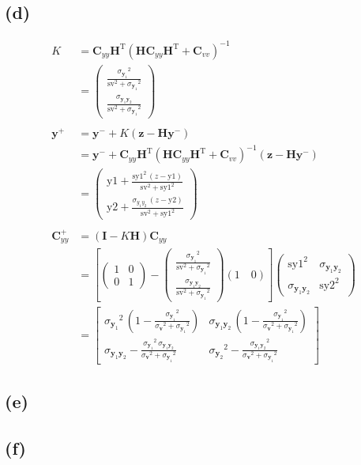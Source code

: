 \documentclass[fleqn, letterpaper]{tufte-handout}
\newcommand{\T}{^\text{T}}
\newcommand{\y}{\mathbf{y}}
\newcommand{\z}{\mathbf{z}}
\newcommand{\I}{\mathbf{I}}
\newcommand{\HH}{\mathbf{H}}
\newcommand{\vecv}{\mathbf{v}}
\newcommand{\cyy}{\mathbf{C}_{yy}}
\newcommand{\cvv}{\mathbf{C}_{vv}}
\newcommand{\KK}{\left(\begin{array}{c} \frac{{\sigma_{\y_1}}^2}{{\mathrm{sv}}^2 + {\sigma_{\y_1}}^2}\\ \frac{\sigma_{\y_1\y_2}}{{\mathrm{sv}}^2 + {\sigma_{\y_1}}^2} \end{array}\right)}
\newcommand{\cyylong}{\left(\begin{array}{cc} {\mathrm{sy1}}^2 & \sigma_{\y_1\y_2}\\ \sigma_{\y_1\y_2} & {\mathrm{sy2}}^2 \end{array}\right)}
\begin{document}
\subsection{(d)}
\begin{align*}
K &= \cyy \HH\T(\HH\cyy\HH\T+\cvv)^{-1} \\
&= \KK\\ \\
\y^+ &= \y^- + K(\z-\HH\y^-) \\
&= \y^- + \cyy \HH\T(\HH\cyy\HH\T+\cvv)^{-1}(\z-\HH\y^-) \\ 
&= \left(\begin{array}{c} \mathrm{y1} + \frac{{\mathrm{sy1}}^2\, \left(z - \mathrm{y1}\right)}{{\mathrm{sv}}^2 + {\mathrm{sy1}}^2}\\ \mathrm{y2} + \frac{\sigma_{y_1y_2}\, \left(z - \mathrm{y2}\right)}{{\mathrm{sv}}^2 + {\mathrm{sy1}}^2} \end{array}\right)\\ \\
\cyy^+  &= \left(\I - K\HH\right)\cyy\\
&= \left[\left(\begin{array}{cc} 1 & 0\\ 0 & 1 \end{array}\right) - \KK (1\quad 0)\right]\cyylong\\
&= \left[\begin{array}{cc}
 {\sigma_{\y_1}}^2\, \left(1 -\frac{{\sigma_{\y_1}}^2}{{\sigma_\vecv}^2 + {\sigma_{\y_1}}^2}\right) 
 &  \sigma_{\y_1\y_2}\, \left(1-\frac{{\sigma_{\y_1}}^2}{{\sigma_\vecv}^2 + {\sigma_{\y_1}}^2}\right)\\
  \sigma_{\y_1\y_2} - \frac{{\sigma_{\y_1}}^2\, \sigma_{\y_1\y_2}}{{\sigma_\vecv}^2 + {\sigma_{\y_1}}^2} 
  & {\sigma_{\y_2}}^2 - \frac{{\sigma_{\y_1\y_2}}^2}{{\sigma_\vecv}^2 + {\sigma_{\y_1}}^2} \end{array}\right]
\end{align*}
\subsection{(e)}
\subsection{(f)}
\end{document}
